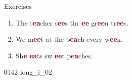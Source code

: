 \documentclass[aspectratio=169, xcolor={dvipsnames,table}]{beamer}
\begin{document}
\begin{frame}[plain]{Exercises }
  \LARGE

  \begin{enumerate}
    \item<2-> The t\textcolor{Maroon}{\bfseries ea}cher s\textcolor{Maroon}{\bfseries ee}s thr\textcolor{Maroon}{\bfseries
            ee} gr\textcolor{Maroon}{\bfseries ee}n tr\textcolor{Maroon}{\bfseries ee}s.

    \item<3-> We m\textcolor{Maroon}{\bfseries ee}t at the b\textcolor{Maroon}{\bfseries ea}ch every
          w\textcolor{Maroon}{\bfseries ee}k.

    \item<4-> Sh\textcolor{Maroon}{\bfseries e} \textcolor{Maroon}{\bfseries ea}ts sw\textcolor{Maroon}{\bfseries
            ee}t p\textcolor{Maroon}{\bfseries ea}ches.
  \end{enumerate}
  \hfill{\tiny 0142}\,{\scriptsize {}\,{\tiny long\_i\_02}}
\end{frame}
\end{document}
